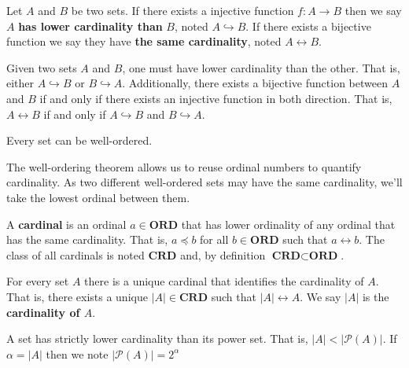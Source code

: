 \documentclass{article}
\newcommand{\marginleft}[1] {\reversemarginpar\marginpar{#1}}
\def\ordinals{\textbf{ORD}}
\def\cardinals{\textbf{CRD}}
\def\ordleq{\preceq}
\def\crdleq{\hookrightarrow}
\def\crdeq{\leftrightarrow}
\begin{document}
\begin{defn}
	Let $A$ \marginleft{Cardinality} and $B$ be two sets. If there exists a injective function $f : A \to B$ then we say $A$ \textbf{has lower cardinality than} $B$, noted $A \crdleq B$. If there exists a bijective function we say they have \textbf{the same cardinality}, noted $A \crdeq B$.
\end{defn}

\begin{prop}
	Given two sets $A$ and $B$, one must have lower cardinality than the other. That is, either $A \crdleq B$ or $B \crdleq A$. Additionally, there exists a bijective function between $A$ and $B$ if and only if there exists an injective function in both direction. That is, $A \crdeq B$ if and only if $A \crdleq B$ and $B \crdleq A$.
\end{prop}

\begin{prop}
	Every set can be well-ordered.
\end{prop}

\begin{remark}
	The well-ordering theorem allows us to reuse ordinal numbers to quantify cardinality. As two different well-ordered sets may have the same cardinality, we'll take the lowest ordinal between them.
\end{remark}

\begin{defn}
	A \textbf{cardinal}  \marginleft{Cardinals: $\cardinals$} is an ordinal $a \in \ordinals$ that has lower ordinality of any ordinal that has the same cardinality. That is, $a \ordleq b$ for all $b \in \ordinals$ such that $a \crdeq b$. The class of all cardinals is noted $\cardinals$ and, by definition $\cardinals \subset \ordinals$.
\end{defn}

\begin{prop}
	For every \marginleft{$|A|$} set $A$ there is a unique cardinal that identifies the cardinality of $A$. That is, there exists a unique $|A| \in \cardinals$ such that $|A| \crdeq A$. We say $|A|$ is the \textbf{cardinality of $A$}.
\end{prop}

\begin{prop}
	A set has strictly lower cardinality than its power set. That is, $|A| < |\mathcal{P}(A)|$. If $\alpha = |A|$ then we note $|\mathcal{P}(A)| = 2^\alpha$
\end{prop}
\end{document}
